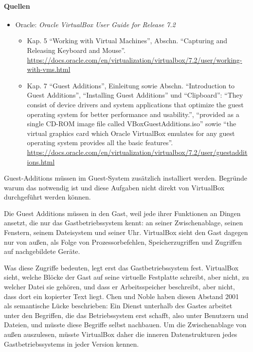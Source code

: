\paragraph{Quellen}
\begin{itemize}[quellen]
  \item Oracle: \emph{Oracle VirtualBox User Guide for Release 7.2}
  \begin{itemize}[nosep]
    \item Kap. 5 \enquote{Working with Virtual Machines}, Abschn. \enquote{Capturing and Releasing Keyboard and Mouse}. \url{https://docs.oracle.com/en/virtualization/virtualbox/7.2/user/working-with-vms.html}
    \item Kap. 7 \enquote{Guest Additions}, Einleitung sowie Abschn. \enquote{Introduction to Guest Additions}, \enquote{Installing Guest Additions} und \enquote{Clipboard}: \enquote{They consist of device drivers and system applications that optimize the guest operating system for better performance and usability.}, \enquote{provided as a single CD-ROM image file called VBoxGuestAdditions.iso} sowie \enquote{the virtual graphics card which Oracle VirtualBox emulates for any guest operating system provides all the basic features}. \url{https://docs.oracle.com/en/virtualization/virtualbox/7.2/user/guestadditions.html}
  \end{itemize}
\end{itemize}

\begin{aufgabe}
Guest-Additions müssen im Guest-System zusätzlich installiert werden. Begründe warum das notwendig ist und diese Aufgaben nicht direkt von VirtualBox durchgeführt werden können.
\end{aufgabe}
\label{sec:guestadditions-warum}

Die Guest Additions müssen in den Gast, weil jede ihrer Funktionen an Dingen ansetzt, die nur das Gastbetriebssystem kennt: an seiner Zwischenablage, seinen Fenstern, seinem Dateisystem und seiner Uhr. VirtualBox sieht den Gast dagegen nur von außen, als Folge von Prozessorbefehlen, Speicherzugriffen und Zugriffen auf nachgebildete Geräte.

Was diese Zugriffe bedeuten, legt erst das Gastbetriebssystem fest. VirtualBox sieht, welche Blöcke der Gast auf seine virtuelle Festplatte schreibt, aber nicht, zu welcher Datei sie gehören, und dass er Arbeitsspeicher beschreibt, aber nicht, dass dort ein kopierter Text liegt. Chen und Noble haben diesen Abstand 2001 als semantische Lücke beschrieben: Ein Dienst unterhalb des Gastes arbeitet unter den Begriffen, die das Betriebssystem erst schafft, also unter Benutzern und Dateien, und müsste diese Begriffe selbst nachbauen. Um die Zwischenablage von außen auszulesen, müsste VirtualBox daher die inneren Datenstrukturen jedes Gastbetriebssystems in jeder Version kennen.

